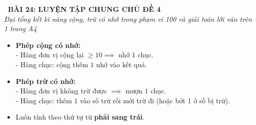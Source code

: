 \documentclass[11pt,a4paper]{article}
\begin{document}
\begin{tcolorbox}[
  enhanced,
  colback=violet!8!white,
  colframe=violet!70!black,
  arc=3mm, boxrule=1.2pt,
  left=3mm, right=3mm, top=2mm, bottom=2mm,
  halign=center
]
  {\LARGE\bfseries\color{violet!90!black}\faBookmark\ BÀI 24: LUYỆN TẬP CHUNG CHỦ ĐỀ 4}\\[1mm]
  {\itshape\footnotesize\color{black!75} Đại tổng kết kĩ năng cộng, trừ có nhớ trong phạm vi 100 và giải toán lời văn trên 1 trang A4}
\end{tcolorbox}

\vspace{-2mm}

\noindent
\begin{minipage}[t]{0.49\textwidth}\vspace{0pt}
\begin{tcolorbox}[
  enhanced,
  colback=violet!4!white,
  colframe=violet!75!black,
  arc=2mm, boxrule=0.8pt,
  left=2mm, right=2mm, top=1.8mm, bottom=1.8mm,
  title={\footnotesize\bfseries\color{white}\faKey\ 1. Hai kĩ năng trụ cột}
]
{\footnotesize
\begin{itemize}\setlength{\itemsep}{1pt}\setlength{\leftskip}{-2.5mm}
  \item \textbf{Phép cộng có nhớ:}\\
  - Hàng đơn vị cộng lại $\ge 10 \implies$ nhớ $1$ chục.\\
  - Hàng chục: cộng thêm $1$ nhớ vào kết quả.
  \item \textbf{Phép trừ có nhớ:}\\
  - Hàng đơn vị không trừ được $\implies$ mượn $1$ chục.\\
  - Hàng chục: thêm $1$ vào số trừ rồi mới trừ đi (hoặc bớt 1 ở số bị trừ).
  \item Luôn tính theo thứ tự từ \textbf{phải sang trái}.
\end{itemize}
}
\end{tcolorbox}
\end{minipage}
\hfill
\end{document}
